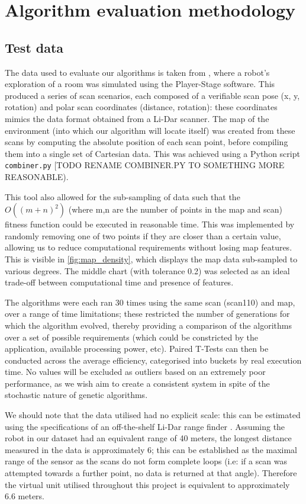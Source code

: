 \documentclass[authoryearcitations]{UoYCSproject}
\begin{document}
\clearpage

\chapter{Algorithm evaluation methodology}
\label{cha:system_design}

\section{Test data}
The data used to evaluate our algorithms is taken from \citet{Lenac2011-co}, where a robot's exploration of a room was simulated using the Player-Stage software. This produced a series of scan scenarios, each composed of a verifiable scan pose (x, y, rotation) and polar scan coordinates (distance, rotation): these coordinates mimics the data format obtained from a Li-Dar scanner. The map of the environment (into which our algorithm will locate itself) was created from these scans by computing the absolute position of each scan point, before compiling them into a single set of Cartesian data. This was achieved using a Python script \lstinline{combiner.py} [TODO RENAME COMBINER.PY TO SOMETHING MORE REASONABLE).

This tool also allowed for the sub-sampling of data such that the $O((m+n)^2)$  (where m,n are the number of points in the map and scan) fitness function could be executed in reasonable time. This was implemented by randomly removing one of two points if they are closer than a certain value, allowing us to reduce computational requirements without losing map features. This is visible in \autoref{fig:map_density}, which displays the map data sub-sampled to various degrees. The middle chart (with tolerance 0.2) was selected as an ideal trade-off between computational time and presence of features.

The algorithms were each ran 30 times using the same scan (scan110) and map, over a range of time limitations; these restricted the number of generations for which the algorithm evolved, thereby providing a comparison of the algorithms over a set of possible requirements (which could be constricted by the application, available processing power, etc). Paired T-Tests can then be conducted across the average efficiency, categorised into buckets by real execution time. No values will be excluded as outliers based on an extremely poor performance, as we wish aim to create a consistent system in spite of the stochastic nature of genetic algorithms.

We should note that the data utilised had no explicit scale: this can be estimated using the specifications of an off-the-shelf Li-Dar range finder \cite{noauthor_undated-bu}. Assuming the robot in our dataset had an equivalent range of 40 meters, the longest distance measured in the data is approximately 6; this can be established as the maximal range of the sensor as the scans do not form complete loops (i.e: if a scan was attempted towards a further point, no data is returned at that angle). Therefore the virtual unit utilised throughout this project is equivalent to approximately 6.6 meters. 
\end{document}
